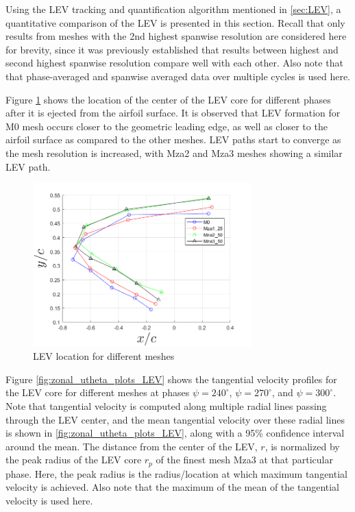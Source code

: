 Using the LEV tracking and quantification algorithm mentioned in \ref{sec:LEV}, a quantitative comparison of the LEV is presented in this section. 
Recall that only results from meshes with the 2nd highest spanwise resolution are considered here for brevity, since it was previously established that results between highest and second highest spanwise resolution compare well with each other. Also note that that phase-averaged and spanwise averaged data over multiple cycles is used here.

Figure \ref{fig:zonal_LEV_location} shows the location of the center of the LEV core for different phases after it is ejected from the airfoil surface. 
It is observed that LEV formation for M0 mesh occurs closer to the geometric leading edge, as well as closer to the airfoil surface as compared to the other meshes. 
LEV paths start to converge as the mesh resolution is increased, with Mza2 and Mza3 meshes showing a similar LEV path.


\begin{figure}[H]
	\centering
	\includegraphics[width=0.75\textwidth]{figures/zonal_adapt_results/LEV/LEV_location}
	\caption{ LEV location for different meshes}
	\label{fig:zonal_LEV_location}
\end{figure}

Figure \ref{fig:zonal_utheta_plots_LEV} shows the tangential velocity profiles for the LEV core for different meshes at phases  $\psi = 240^\circ$,  $\psi = 270^\circ$, and  $\psi = 300^\circ$. 
Note that tangential velocity is computed along multiple radial lines passing through the LEV center, and the mean tangential velocity over these radial lines is shown in \ref{fig:zonal_utheta_plots_LEV}, along with a 95\% confidence interval around the mean. 
The distance from the center of the LEV, $r$, is normalized by the peak radius of the LEV core $r_p$ of the finest mesh Mza3 at that particular phase. 
Here, the peak radius is the radius/location at which maximum tangential velocity is achieved. 
Also note that the maximum of the mean of the tangential velocity is used here. 

